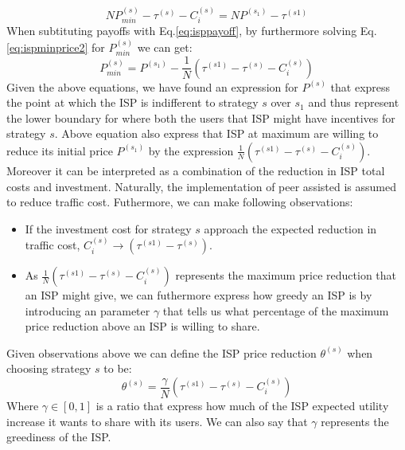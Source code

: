 \documentclass[paper]{ieice}
\begin{document}
\begin{equation}\label{eq:ispminprice2}
	N P^{(s)}_{min} - \tau^{(s)} - C^{(s)}_i = N P^{(s_1)} - \tau^{(s1)}  
\end{equation}
When subtituting payoffs with Eq.\ref{eq:isppayoff}, by furthermore solving Eq.\ref{eq:ispminprice2} for $P^{(s)}_{min}$ we can get:
\begin{equation}\label{eq:ispminprice3}
	P^{(s)}_{min} = P^{(s_1)} - \frac{1}{N} ( \tau^{(s1)} - \tau^{(s)} -  C^{(s)}_i  )
\end{equation}
Given the above equations, we have found an expression for $P^{(s)}$ that express the point at which the ISP is indifferent to strategy $s$ over $s_1$ and thus represent the lower boundary for where both the users that ISP might have incentives for strategy $s$. 
Above equation also express that ISP at maximum are willing to reduce its initial price $P^{(s_1)}$ by the expression $\frac{1}{N} ( \tau^{(s1)} - \tau^{(s)} -  C^{(s)}_i  )$.
Moreover it can be interpreted as a combination of the reduction in ISP total costs and investment.
Naturally, the implementation of peer assisted is assumed to reduce traffic cost.  
Futhermore, we can make following observations:
\begin{itemize}
	\item If the investment cost for strategy $s$ approach the expected reduction in traffic cost, $C^{(s)}_i \to (\tau^{(s1)} - \tau^{(s)})$.
	\item As $\frac{1}{N} ( \tau^{(s1)} - \tau^{(s)} -  C^{(s)}_i )$ represents the maximum price reduction that an ISP might give, we can futhermore express how greedy an ISP is by introducing an parameter $\gamma$ that tells us what percentage of the maximum price reduction above an ISP is willing to share.  
\end{itemize}
\newtheorem{theorem10}{Definition}
\begin{theorem}
Given observations above we can define the ISP price reduction $\theta^{(s)}$ when choosing strategy $s$ to be:
\begin{equation}
 \theta^{(s)} = \frac{\gamma}{N} ( \tau^{(s1)} - \tau^{(s)} -  C^{(s)}_i  )
\end{equation}
Where $\gamma \in [0,1]$ is a ratio that express how much of the ISP expected utility increase it wants to share with its users.   
We can also say that $\gamma$ represents the greediness of the ISP.
\end{theorem}
\end{document}
